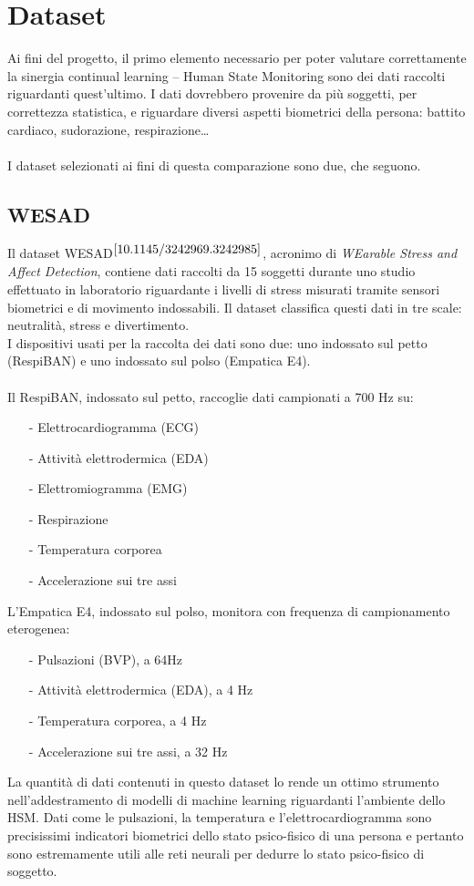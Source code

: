 \chapter{Dataset}
Ai fini del progetto, il primo elemento necessario per poter valutare correttamente la sinergia continual learning -- Human State Monitoring sono dei dati raccolti riguardanti quest'ultimo. I dati dovrebbero provenire da più soggetti, per correttezza statistica, e riguardare diversi aspetti biometrici della persona: battito cardiaco, sudorazione, respirazione\ldots\\\\
I dataset selezionati ai fini di questa comparazione sono due, che seguono.
\section{WESAD}
Il dataset WESAD$^{\cite{10.1145/3242969.3242985}}$, acronimo di \textit{WEarable Stress and Affect Detection}, contiene dati raccolti da 15 soggetti durante uno studio effettuato in laboratorio riguardante i livelli di stress misurati tramite sensori biometrici e di movimento indossabili. Il dataset classifica questi dati in tre scale: neutralità, stress e divertimento.\\
I dispositivi usati per la raccolta dei dati sono due: uno indossato sul petto (RespiBAN) e uno indossato sul polso (Empatica E4).\\\\Il RespiBAN, indossato sul petto, raccoglie dati campionati a 700 Hz su:
\begin{itemize}
    \item[-] Elettrocardiogramma (ECG)
    \item[-] Attività elettrodermica (EDA)
    \item[-] Elettromiogramma (EMG)
    \item[-] Respirazione
    \item[-] Temperatura corporea
    \item[-] Accelerazione sui tre assi
\end{itemize}
\pagebreak
L'Empatica E4, indossato sul polso, monitora con frequenza di campionamento eterogenea:
\begin{itemize}
    \item[-] Pulsazioni (BVP), a 64Hz
    \item[-] Attività elettrodermica (EDA), a 4 Hz
    \item[-] Temperatura corporea, a 4 Hz
    \item[-] Accelerazione sui tre assi, a 32 Hz
\end{itemize}
La quantità di dati contenuti in questo dataset lo rende un ottimo strumento nell'addestramento di modelli di machine learning riguardanti l'ambiente dello HSM. Dati come le pulsazioni, la temperatura e l'elettrocardiogramma sono precisissimi indicatori biometrici dello stato psico-fisico di una persona e pertanto sono estremamente utili alle reti neurali per dedurre lo stato psico-fisico di soggetto.
